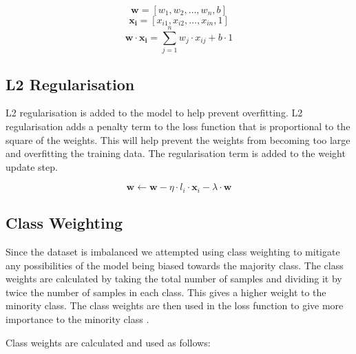 \begin{equation}
  \boldsymbol{w} = [w_1, w_2, \ldots, w_n, b]
\end{equation}
\begin{equation}
  \boldsymbol{x_i} = [x_{i1}, x_{i2}, \ldots, x_{in}, 1]
\end{equation}
\begin{equation}
  \boldsymbol{w} \cdot \boldsymbol{x_i} = \sum_{j=1}^{n} w_j \cdot x_{ij} + b \cdot 1
\end{equation}

\subsection{L2 Regularisation}

L2 regularisation is added to the model to help prevent overfitting. L2 regularisation adds a penalty term to the loss function that is proportional to the square of the weights. This will help prevent the weights from becoming too large and overfitting the training data. The regularisation term is added to the weight update step.

\begin{equation}
  \boldsymbol{w} \gets \boldsymbol{w} - \eta \cdot l_i \cdot \boldsymbol{x}_i - \lambda \cdot \boldsymbol{w}
\end{equation}

\subsection{Class Weighting}

%
%

Since the dataset is imbalanced we attempted using class weighting to mitigate any possibilities of the model being biased towards the majority class. 
The class weights are calculated by taking the total number of samples and dividing it by twice the number of samples in each class. This gives a higher weight to the minority class. The class weights are then used in the loss function to give more importance to the minority class \cite{Abhinav2023}.

Class weights are calculated and used as follows:

